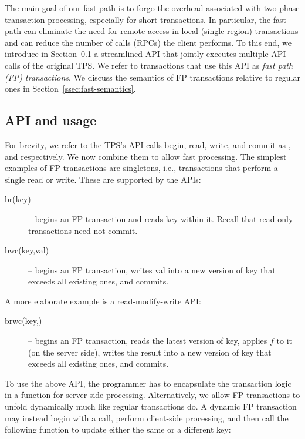 

The main goal of our fast path  is to forgo the overhead associated with two-phase transaction processing, especially for short transactions.
In particular, the fast path can eliminate the need for remote access in local (single-region) transactions and can reduce the number of 
calls (RPCs) the client performs.
To this end, we introduce in Section~\ref{ssec:fast-api} a streamlined API that jointly executes multiple API calls of the original TPS. 
We refer to transactions that use this API as \emph{fast path (FP) transactions}.
We discuss the semantics of FP transactions relative to regular ones in Section~\ref{ssec:fast-semantics}.

\subsection{API and usage}
\label{ssec:fast-api}

For brevity, we refer to the TPS's API calls  begin, read, write, and commit as , and  respectively. 
We now combine them to allow fast processing.
The simplest examples of FP transactions are singletons, i.e., transactions that perform a single
read or write. These are supported by the APIs:
\begin{description}
\item[br(key)] -- begins an FP transaction and reads key within it. Recall that read-only transactions need not commit. 
\item[bwc(key,val)] -- begins an FP transaction,  writes val into a new version of key that exceeds all existing ones, and commits.
\end{description}

A more elaborate example is a read-modify-write API: 
\begin{description}
\item[brwc(key,)] -- begins an FP transaction,  reads the latest version of key, applies $f$ to it (on the server side), 
	writes the result into a new version of key that exceeds all existing ones, and commits.
\end{description}

To use the above API, the programmer has to encapsulate the transaction logic in a function for server-side processing. 
Alternatively, we allow FP transactions to unfold dynamically much like regular  transactions do.
A dynamic FP transaction may instead begin with a  call, perform client-side processing, and then call the following
function to update either the same or a different key: 

